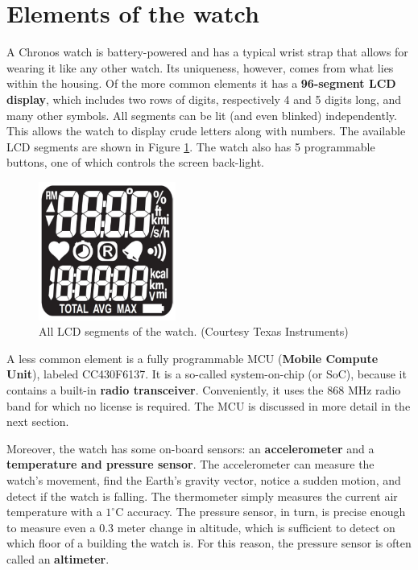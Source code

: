 \section{Elements of the watch}
A Chronos watch is battery-powered and has a typical wrist strap that
allows for wearing it like any other watch. Its uniqueness, however,
comes from what lies within the housing. Of the more common elements
it has a {\bf 96-segment LCD display}, which includes two rows of
digits, respectively 4 and 5 digits long, and many other symbols. All
segments can be lit (and even blinked) independently.  This allows the
watch to display crude letters along with numbers. The available LCD
segments are shown in Figure \ref{fig:chronos_segs}.  The watch also
has 5 programmable buttons, one of which controls the screen
back-light.

\begin{figure}[h]
  \centering
  \includegraphics[width=0.4\textwidth]{img/chronos_segs.png}
  \caption{All LCD segments of the watch. (Courtesy Texas
  Instruments)}
  \label{fig:chronos_segs}
\end{figure}

A less common element is a fully programmable MCU ({\bf Mobile Compute
Unit}), labeled CC430F6137. It is a so-called system-on-chip (or
SoC), because it contains a built-in {\bf radio transceiver}.
Conveniently, it uses the 868 MHz radio band for which no license is
required. The MCU is discussed in more detail in the next section.

Moreover, the watch has some on-board sensors: an {\bf accelerometer}
and a {\bf temperature and pressure sensor}. The accelerometer can
measure the watch's movement, find the Earth's gravity vector,
notice a sudden motion, and detect if the watch is falling. The
thermometer simply measures the current air temperature with a
$1^{\circ}$C accuracy. The pressure sensor, in turn, is precise enough to
measure even a 0.3 meter change in altitude, which is sufficient to
detect on which floor of a building the watch is. For this reason, the
pressure sensor is often called an {\bf altimeter}.


